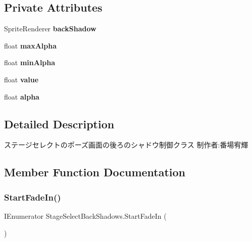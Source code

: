 \subsection*{Private Attributes}
\begin{DoxyCompactItemize}
\item 
\mbox{\label{class_stage_select_back_shadows_a03c0b7dc55f7b765b32fee23f22d6f96}} 
Sprite\+Renderer {\bfseries back\+Shadow}
\item 
\mbox{\label{class_stage_select_back_shadows_aa2acb3f4c72dbd85e43998057b4627a5}} 
float {\bfseries max\+Alpha}
\item 
\mbox{\label{class_stage_select_back_shadows_a7b7002f7d76f795ef7e452039131f84f}} 
float {\bfseries min\+Alpha}
\item 
\mbox{\label{class_stage_select_back_shadows_ad3366ba65b7268b948f7de199f2943c2}} 
float {\bfseries value}
\item 
\mbox{\label{class_stage_select_back_shadows_aae5cab3b8e85ce9e2e72d74ee704c54b}} 
float {\bfseries alpha}
\end{DoxyCompactItemize}


\subsection{Detailed Description}
ステージセレクトのポーズ画面の後ろのシャドウ制御クラス 制作者\+:番場宥輝 



\subsection{Member Function Documentation}
\mbox{\label{class_stage_select_back_shadows_a326d3770dd525ced267654607927c818}} 
\subsubsection{\texorpdfstring{Start\+Fade\+In()}{StartFadeIn()}}
{\footnotesize\ttfamily I\+Enumerator Stage\+Select\+Back\+Shadows.\+Start\+Fade\+In (\begin{DoxyParamCaption}{ }\end{DoxyParamCaption})\hspace{0.3cm}{\ttfamily [inline]}}



